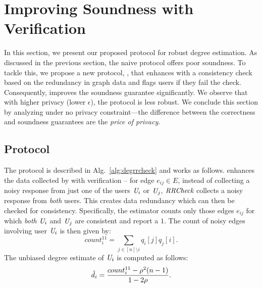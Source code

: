 
\section{Improving Soundness with Verification}\label{sec:robust-rr-checks}

In this section, we present our proposed protocol for robust degree estimation. 
As discussed in the previous section, the naive \DegRRNaive{} protocol offers poor soundness. To tackle
this, we propose a new protocol, \DegRRCheck, that enhances
\DegRRNaive{} with a consistency check based on the
redundancy in graph data and flags users if they fail the check. Consequently, \DegRRNaive{} improves the soundness guarantee significantly. We observe that with higher privacy (lower $\epsilon$), the protocol is less robust. We conclude this section by analyzing \DegRRCheck{} under no privacy constraint---the difference between the correctness and soundness guarantees are the \emph{price of privacy}.

  \vspace{-0.1cm}  \subsection{\DegRRCheck{} Protocol} \label{sec:protocol:check} 
The \DegRRCheck{} protocol is described in Alg.~\ref{alg:degrrcheck} and works as follows. \DegRRCheck{} enhances the data collected by \DegRRNaive{} with verification -- for edge $e_{ij} \in E$, instead of collecting a noisy response from just one of the users
$\textit{U}_i$ or $\textit{U}_j$, $\textit{RRCheck}{}$ collects a noisy response from \emph{both} users. This creates
data redundancy which can then be checked for consistency. Specifically, the estimator counts only those edges $e_{ij}$ for which \textit{both} $\textit{U}_i$ and $\textit{U}_j$ are consistent and report a $1$. 
 The count of noisy edges involving user $\textit{U}_i$ is then given by:
\[count_i^{11} = \sum_{j\in [n]\setminus i} q_{i}[j] q_{j}[i].\]
The unbiased degree estimate of $\textit{U}_i$ is computed as follows:
\begin{equation}\label{eq:deg-est}\vspace{-0.1cm}
    \hd_i = \frac{count_i^{11} - \rho^2(n-1)}{1-2\rho}.
\end{equation}


